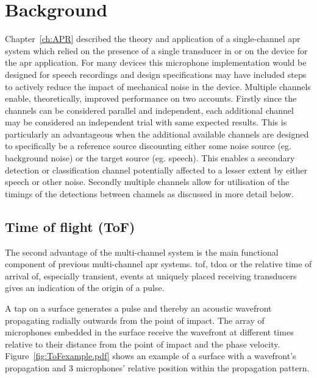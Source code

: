 \section{Background}
Chapter~\ref{ch:APR} described the theory and application of a single-channel \gls{apr} system which relied on the presence of a single transducer in or on the device for the \gls{apr} application. For many devices this microphone implementation would be designed for speech recordings and design specifications may have included steps to actively reduce the impact of mechanical noise in the device. Multiple channels enable, theoretically, improved performance on two accounts. Firstly since the channels can be considered parallel and independent, each additional channel may be considered an independent trial with same expected results. This is particularly an advantageous when the additional available channels are designed to specifically be a reference source discounting either some noise source (eg. background noise) or the target source (eg. speech). This enables a secondary detection or classification channel potentially affected to a lesser extent by either speech or other noise. Secondly multiple channels allow for utilisation of the timings of the detections between channels as discussed in more detail below.

\subsection{Time of flight (ToF)}
The second advantage of the multi-channel system is the main functional component of previous multi-channel \gls{apr} systems\cite{TouchSystems2006}\cite{US7411581}. \gls{tof}, \gls{tdoa} or the relative time of arrival of, especially transient, events at uniquely placed receiving transducers gives an indication of the origin of a pulse.

A tap on a surface generates a pulse and thereby an acoustic wavefront propagating radially outwards from the point of impact. The array of microphones embedded in the surface receive the wavefront at different times relative to their distance from the point of impact and the phase velocity. Figure~\ref{fig:ToFexample.pdf} shows an example of a surface with a wavefront's propagation and 3 microphones' relative position within the propagation pattern.

